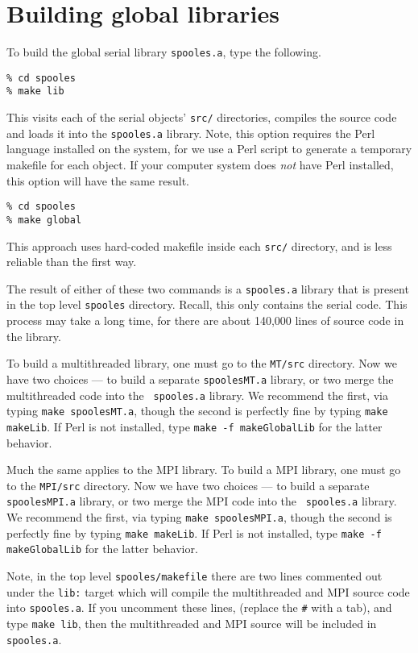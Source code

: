 \par
\section{Building global libraries}
\par
To build the global serial library {\tt spooles.a}, type the
following.
\begin{verbatim}
% cd spooles
% make lib
\end{verbatim}
This visits each of the serial objects' {\tt src/} directories,
compiles the source code and loads it into the {\tt spooles.a}
library.
Note, this option requires the Perl language installed on the
system, for we use a Perl script to generate a temporary makefile
for each object.
If your computer system does {\it not} have Perl installed, 
this option will have the same result.
\begin{verbatim}
% cd spooles
% make global
\end{verbatim}
This approach uses hard-coded makefile inside each {\tt src/}
directory, and is less reliable than the first way.
\par
The result of either of these two commands is a {\tt spooles.a}
library that is present in the top level {\tt spooles} directory.
Recall, this only contains the serial code.
This process may take a long time, for there are about 140,000 
lines of source code in the library.
\par
To build a multithreaded library, one must go to the {\tt MT/src}
directory.
Now we have two choices --- to build a separate {\tt spoolesMT.a}
library, or two merge the multithreaded code into the {\tt
spooles.a} library.
We recommend the first, via typing {\tt make spoolesMT.a},
though the second is perfectly fine by typing {\tt make makeLib}.
If Perl is not installed, type {\tt make -f makeGlobalLib} for the
latter behavior.
\par
Much the same applies to the MPI library.
To build a MPI library, one must go to the {\tt MPI/src}
directory.
Now we have two choices --- to build a separate {\tt spoolesMPI.a}
library, or two merge the MPI code into the {\tt
spooles.a} library.
We recommend the first, via typing {\tt make spoolesMPI.a},
though the second is perfectly fine by typing {\tt make makeLib}.
If Perl is not installed, type {\tt make -f makeGlobalLib} for the
latter behavior.
\par
Note, in the top level {\tt spooles/makefile} there are two lines
commented out under the {\tt lib:} target which will compile the
multithreaded and MPI source code into {\tt spooles.a}.
If you uncomment these lines, (replace the {\tt \#} with a tab),
and type {\tt make lib}, then the multithreaded and MPI source will
be included in {\tt spooles.a}.
\par
